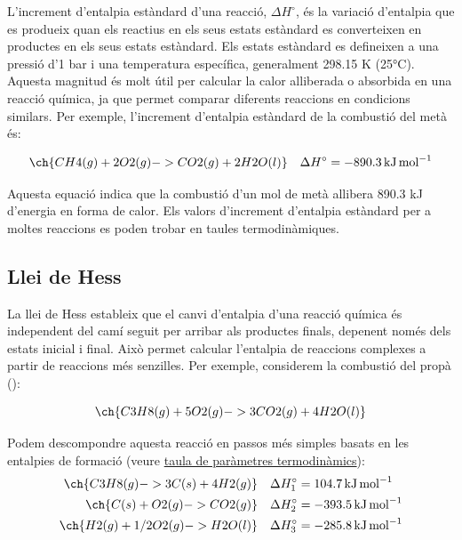 L'increment d'entalpia estàndard d'una reacció, $\Delta H^\circ$, és la variació d'entalpia que es produeix quan els reactius en els seus estats estàndard es converteixen en productes en els seus estats estàndard. Els estats estàndard es defineixen a una pressió d'1 bar i una temperatura específica, generalment 298.15 K (25°C). Aquesta magnitud és molt útil per calcular la calor alliberada o absorbida en una reacció química, ja que permet comparar diferents reaccions en condicions similars. Per exemple, l'increment d'entalpia estàndard de la combustió del metà és:

\begin{equation}
\ch{CH4(g) + 2 O2(g) -> CO2(g) + 2 H2O(l)} \quad \Delta H^\circ = -890.3 \, \si{\kilo\joule\per\mole}
\end{equation}

Aquesta equació indica que la combustió d'un mol de metà allibera 890.3 kJ d'energia en forma de calor. Els valors d'increment d'entalpia estàndard per a moltes reaccions es poden trobar en taules termodinàmiques.

\subsection{Llei de Hess}

La llei de Hess estableix que el canvi d'entalpia d'una reacció química és independent del camí seguit per arribar als productes finals, depenent només dels estats inicial i final. Això permet calcular l'entalpia de reaccions complexes a partir de reaccions més senzilles. Per exemple, considerem la combustió del propà ():

\begin{equation}
\ch{C3H8(g) + 5 O2(g) -> 3 CO2(g) + 4 H2O(l)}
\end{equation}

Podem descompondre aquesta reacció en passos més simples basats en les entalpies de formació (veure \href{https://biocomputing-teaching.github.io/WebQuimicaAutomocio/pdf/TaulaUnitats.pdf}{taula de paràmetres termodinàmics}):
\begin{align}
\ch{C3H8(g) -> 3 C(s) + 4 H2(g)} & \quad \Delta H_1^\circ = 104.7 \, \si{\kilo\joule\per\mole} \\
\ch{C(s) + O2(g) -> CO2(g)} & \quad \Delta H_2^\circ = -393.5 \, \si{\kilo\joule\per\mole} \\
\ch{H2(g) + 1/2 O2(g) -> H2O(l)} & \quad \Delta H_3^\circ = -285.8 \, \si{\kilo\joule\per\mole}
\end{align}

